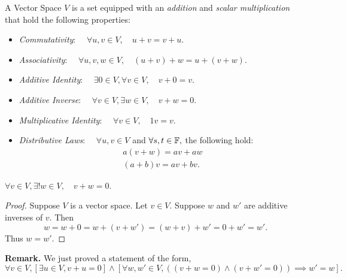 \documentclass[12pt]{book}
\begin{document}
\begin{definition} \label{def:vector-space}
    A Vector Space $V$ is a set equipped with an \emph{addition} and \emph{scalar multiplication} that hold the following properties:
    \begin{itemize}
        \item \emph{Commutativity}: $\quad \forall u,v \in V, \quad u+v=v+u.$ 
        \item \emph{Associativity}: $\quad \forall u,v,w \in V, \quad (u + v) + w = u + (v + w).$ 
        \item \emph{Additive Identity}: $\quad \exists 0 \in V, \forall v \in V, \quad v + 0 = v.$
        \item \emph{Additive Inverse}: $\quad \forall v \in V, \exists w \in V, \quad v + w = 0.$
        \item \emph{Multiplicative Identity}: $\quad \forall v \in V, \quad 1v = v.$
        \item \emph{Distributive Laws}: $\quad \forall u,v \in V$ and $ \forall s,t \in \mathbb{F},$ the following hold:
            \[
            \begin{aligned}
                a(v + w) = av + aw \\ 
                (a + b)v = av + bv.
            \end{aligned}
            \]
    \end{itemize}
\end{definition}


\begin{theorem}\label{thm:unique-add-inv}
    $\forall v \in V, \exists! w \in V, \quad v + w = 0.$
\end{theorem}
\begin{proof}
    Suppose $V$ is a vector space. Let $ v \in V.$ Suppose $w$ and $w'$ are additive inverses of $v.$ Then
    \[
        w = w + 0 = w + (v +w') = (w + v) + w' = 0 + w' = w'.
    \]
    Thus $w = w'$. 
\end{proof}


\textbf{Remark.} We just proved a statement of the form,
\[
    \forall v \in V, [\exists u \in V, v + u = 0] \land [\forall w,w' \in V, ((v + w = 0) \land (v + w' = 0))\implies w' = w].
\]
\end{document}
